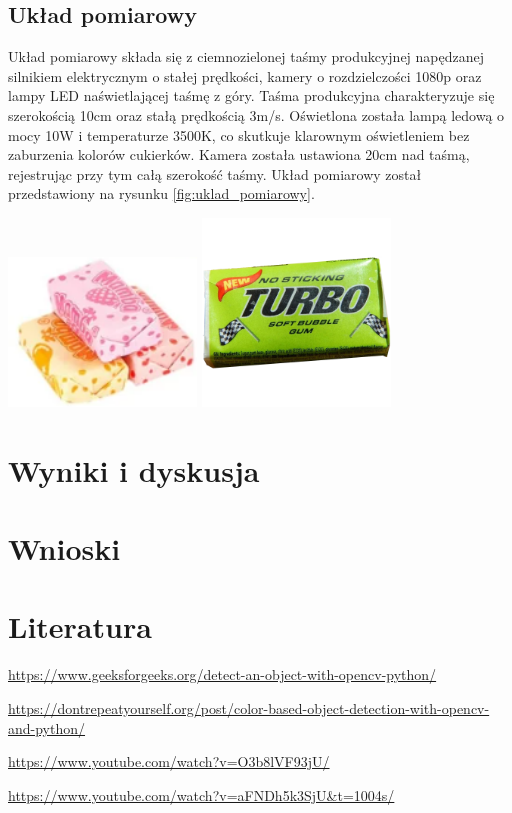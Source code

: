 \documentclass{article}
\begin{document}
\subsection{Układ pomiarowy}

Układ pomiarowy składa się z ciemnozielonej taśmy produkcyjnej napędzanej silnikiem elektrycznym o stałej prędkości, kamery o rozdzielczości 1080p oraz lampy LED naświetlającej taśmę z góry.
Taśma produkcyjna charakteryzuje się szerokością 10cm oraz stałą prędkością 3m/s. Oświetlona została lampą ledową o mocy 10W i temperaturze 3500K, co skutkuje klarownym oświetleniem bez zaburzenia kolorów cukierków.
Kamera została ustawiona 20cm nad taśmą, rejestrując przy tym całą szerokość taśmy.
Układ pomiarowy został przedstawiony na rysunku \ref{fig:uklad_pomiarowy}.

\includegraphics[width=5cm]{mamba.png}
\includegraphics[width=5cm]{gumaturbo.png}


\section{Wyniki i dyskusja}

\section{Wnioski}

\section{Literatura}

\begin{thebibliography}{9}
\url{https://www.geeksforgeeks.org/detect-an-object-with-opencv-python/}

\url{https://dontrepeatyourself.org/post/color-based-object-detection-with-opencv-and-python/}

\url{https://www.youtube.com/watch?v=O3b8lVF93jU/}

\url{https://www.youtube.com/watch?v=aFNDh5k3SjU&t=1004s/}

\end{thebibliography}
\end{document}
